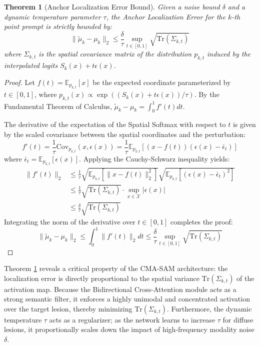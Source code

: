 \documentclass[onecolumn]{IEEEtran}
\numberwithin{equation}{section}
\newtheorem{theorem}{Theorem}[section]
\theoremstyle{definition}
\theoremstyle{remark}
\begin{document}
\begin{theorem}[Anchor Localization Error Bound]
\label{thm:ale_bound}
Given a noise bound $\delta$ and a dynamic temperature parameter $\tau$, the Anchor Localization Error for the $k$-th point prompt is strictly bounded by:
\begin{equation}
    \|\tilde{\mu}_k - \mu_k\|_2 \le \frac{\delta}{\tau} \sup_{t \in [0,1]} \sqrt{\mathrm{Tr}(\Sigma_{k, t})}
\end{equation}
where $\Sigma_{k, t}$ is the spatial covariance matrix of the distribution $p_{k, t}$ induced by the interpolated logits $S_k(x) + t\epsilon(x)$.
\end{theorem}

\begin{proof}
Let $f(t) = \mathbb{E}_{p_{k, t}}[x]$ be the expected coordinate parameterized by $t \in [0, 1]$, where $p_{k, t}(x) \propto \exp((S_k(x) + t\epsilon(x))/\tau)$. By the Fundamental Theorem of Calculus, $\tilde{\mu}_k - \mu_k = \int_{0}^{1} f'(t) dt$. 

The derivative of the expectation of the Spatial Softmax with respect to $t$ is given by the scaled covariance between the spatial coordinates and the perturbation:
\begin{equation}
    f'(t) = \frac{1}{\tau} \mathrm{Cov}_{p_{k, t}}(x, \epsilon(x)) = \frac{1}{\tau} \mathbb{E}_{p_{k, t}} \left[ (x - f(t)) (\epsilon(x) - \bar{\epsilon}_t) \right]
\end{equation}
where $\bar{\epsilon}_t = \mathbb{E}_{p_{k, t}}[\epsilon(x)]$. Applying the Cauchy-Schwarz inequality yields:
\begin{align}
    \|f'(t)\|_2 &\le \frac{1}{\tau} \sqrt{ \mathbb{E}_{p_{k, t}} \left[ \|x - f(t)\|_2^2 \right] } \sqrt{ \mathbb{E}_{p_{k, t}} \left[ (\epsilon(x) - \bar{\epsilon}_t)^2 \right] } \\
    &\le \frac{1}{\tau} \sqrt{\mathrm{Tr}(\Sigma_{k, t})} \cdot \sup_{x \in \mathcal{X}} |\epsilon(x)| \\
    &\le \frac{\delta}{\tau} \sqrt{\mathrm{Tr}(\Sigma_{k, t})}
\end{align}
Integrating the norm of the derivative over $t \in [0, 1]$ completes the proof:
\begin{equation}
    \|\tilde{\mu}_k - \mu_k\|_2 \le \int_{0}^{1} \|f'(t)\|_2 dt \le \frac{\delta}{\tau} \sup_{t \in [0,1]} \sqrt{\mathrm{Tr}(\Sigma_{k, t})}
\end{equation}
\end{proof}

Theorem \ref{thm:ale_bound} reveals a critical property of the CMA-SAM architecture: the localization error is directly proportional to the spatial variance $\mathrm{Tr}(\Sigma_{k, t})$ of the activation map. Because the Bidirectional Cross-Attention module acts as a strong semantic filter, it enforces a highly unimodal and concentrated activation over the target lesion, thereby minimizing $\mathrm{Tr}(\Sigma_{k, t})$. Furthermore, the dynamic temperature $\tau$ acts as a regularizer; as the network learns to increase $\tau$ for diffuse lesions, it proportionally scales down the impact of high-frequency modality noise $\delta$.
\end{document}
